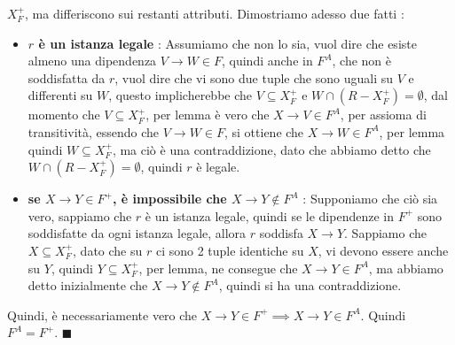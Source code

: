 \documentclass[12pt, letterpaper]{article}
\begin{document}
\(X^+_F\), ma differiscono sui restanti attributi. Dimostriamo adesso due fatti :\begin{itemize}
    \item \textbf{\(r\) è un istanza legale} : Assumiamo che non lo sia, vuol dire che esiste almeno una dipendenza \(V\rightarrow W\in F\),
    quindi anche in \(F^A\), che non è soddisfatta da \(r\), vuol dire che vi sono due tuple che sono uguali su \(V\) e 
    differenti su \(W\), questo implicherebbe che \(V\subseteq X^+_F\) e \(W\cap (R-X^+_F)=\emptyset\), dal momento che 
    \(V\subseteq X^+_F\), per lemma è vero che \(X\rightarrow V\in F^A\), per assioma di transitività,  
    essendo che \(V\rightarrow W\in F\), si ottiene che \(X\rightarrow W\in F^A\), per lemma quindi \(W\subseteq X^+_F\), 
    ma ciò è una contraddizione, dato che abbiamo detto che  \(W\cap (R-X^+_F)=\emptyset\), quindi \(r\) è legale.
    \item \textbf{ se \(X\rightarrow Y \in F^+\), è impossibile che \(X\rightarrow Y \notin F^A\)} : Supponiamo che 
    ciò sia vero, sappiamo che \(r\) è un istanza legale, quindi se le dipendenze in \(F^+\) sono soddisfatte 
    da ogni istanza legale, allora \(r\) soddisfa \(X\rightarrow Y\). Sappiamo che \(X\subseteq X^+_F\), dato 
    che su \(r\) ci sono 2 tuple identiche su \(X\), vi devono essere anche su \(Y\), quindi \(Y\subseteq X^+_F\), 
    per lemma, ne consegue che \(X\rightarrow Y \in F^A\), ma abbiamo detto inizialmente che \(X\rightarrow Y \notin F^A\), 
    quindi si ha una contraddizione.
\end{itemize}
Quindi, è necessariamente vero che  \(X\rightarrow Y \in F^+ \implies X\rightarrow Y \in F^A\). Quindi \(F^A=F^+\). \(\blacksquare\)
\end{document}
